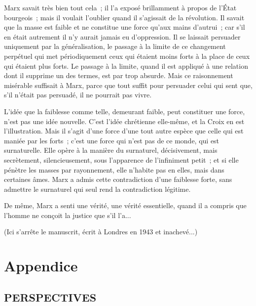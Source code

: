 \documentclass[french,twoside]{book} %
\begin{document}
Marx savait très bien tout cela ; il l'a exposé brillamment à propos de l'État bourgeois ; mais il voulait l'oublier quand il s'agissait de la révolution. Il savait que la masse est faible et ne constitue une force qu'aux mains d'autrui ; car s'il en était autrement il n'y aurait jamais eu d'oppression. Il se laissait persuader uniquement par la généralisation, le passage à la limite de ce changement perpétuel qui met périodiquement ceux qui étaient moins forts à la place de ceux qui étaient plus forts. Le passage à la limite, quand il est appliqué à une relation dont il supprime un des termes, est par trop absurde. Mais ce raisonnement misérable suffisait à Marx, parce que tout suffit pour persuader celui qui sent que, s'il n'était pas persuadé, il ne pourrait pas vivre.\par
L'idée que la faiblesse comme telle, demeurant faible, peut constituer une force, n'est pas une idée nouvelle. C'est l'idée chrétienne elle-même, et la Croix en est l'illustration. Mais il s'agit d'une force d'une tout autre espèce que celle qui est maniée par les forts ; c'est une force qui n'est pas de ce monde, qui est surnaturelle. Elle opère à la manière du surnaturel, décisivement, mais secrètement, silencieusement, sous l'apparence de l'infiniment petit ; et si elle pénètre les masses par rayonnement, elle n'habite pas en elles, mais dans certaines âmes. Marx a admis cette contradiction d'une faiblesse forte, sans admettre le surnaturel qui seul rend la contradiction légitime.\par
De même, Marx a senti une vérité, une vérité essentielle, quand il a compris que l'homme ne conçoit la justice que s'il l'a...\par
(Ici s'arrête le manuscrit, écrit à Londres en 1943 et inachevé...)\par

\begin{center}
\end{center}
\backmatter \section[Appendice ]{Appendice \protect\footnotemark }\renewcommand{\leftmark}{Appendice }

\noindent \par
\subsection[PERSPECTIVES]{PERSPECTIVES}
\end{document}
